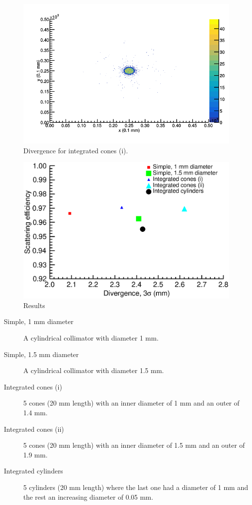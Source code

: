\documentclass[a4paper]{article}
\begin{document}
\begin{figure}[H]
  \centering
  \includegraphics[width=\textwidth]{scatter.png}
  \caption{Divergence for integrated cones (i).}
  \label{fig:scatter}
\end{figure}

\begin{figure}[H]
  \centering
  \includegraphics[width=\textwidth]{efficiency.eps}
  \caption{Results}
  \label{fig:EffvsDiv}
\end{figure}
\begin{description}
  \item[Simple, 1 mm diameter] A cylindrical collimator with diameter 1 mm.
  \item[Simple, 1.5 mm diameter] A cylindrical collimator with diameter 1.5 mm.
  \item[Integrated cones (i)] 5 cones (20 mm length) with an inner diameter of 1 mm and an outer of 1.4 mm.
  \item[Integrated cones (ii)] 5 cones (20 mm length) with an inner diameter of 1.5 mm and an outer of 1.9 mm.
  \item[Integrated cylinders] 5 cylinders (20 mm length) where the last one had a diameter of 1 mm and the rest an increasing diameter of 0.05 mm.
\end{description}
\end{document}
